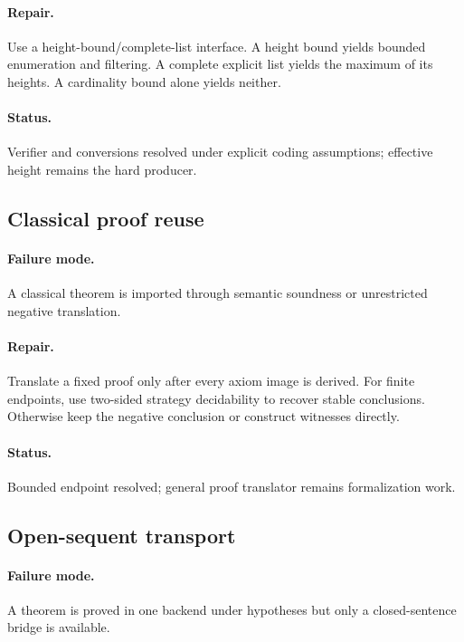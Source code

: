 \paragraph{Repair.}
Use a height-bound/complete-list interface.  A height bound yields bounded enumeration and filtering.  A complete explicit list yields the maximum of its heights.  A cardinality bound alone yields neither.

\paragraph{Status.}
Verifier and conversions resolved under explicit coding assumptions; effective height remains the hard producer.

\subsection{Classical proof reuse}

\paragraph{Failure mode.}
A classical theorem is imported through semantic soundness or unrestricted negative translation.

\paragraph{Repair.}
Translate a fixed proof only after every axiom image is derived.  For finite endpoints, use two-sided strategy decidability to recover stable conclusions.  Otherwise keep the negative conclusion or construct witnesses directly.

\paragraph{Status.}
Bounded endpoint resolved; general proof translator remains formalization work.

\subsection{Open-sequent transport}

\paragraph{Failure mode.}
A theorem is proved in one backend under hypotheses but only a closed-sentence bridge is available.

